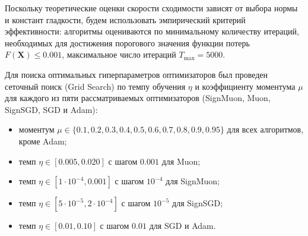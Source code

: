 \documentclass{article}
\begin{document}
Поскольку теоретические оценки скорости сходимости зависят от выбора нормы и констант гладкости, будем использовать эмпирический критерий эффективности: алгоритмы оцениваются по минимальному количеству итераций, необходимых для достижения порогового значения функции потерь $F(\mathbf{X}) \le 0.001$, максимальное число итераций $T_{\max} = 5000$. 

Для поиска оптимальных гиперпараметров оптимизаторов был проведен сеточный поиск (Grid Search) по темпу обучения $\eta$ и коэффициенту моментума $\mu$ для каждого из пяти рассматриваемых оптимизаторов (SignMuon, Muon, SignSGD, SGD и Adam):
\begin{itemize}
    \item моментум $\mu \in \{0.1, 0.2, 0.3, 0.4, 0.5, 0.6, 0.7, 0.8, 0.9, 0.95\}$ для всех алгоритмов, кроме Adam;
    \item темп $\eta \in [0.005, 0.020]$ с шагом $0.001$ для Muon;
    \item темп $\eta \in [1\cdot 10^{-4}, 0.001]$ с шагом $10^{-4}$ для SignMuon;
    \item темп $\eta \in [5\cdot 10^{-5}, 2\cdot 10^{-4}]$ с шагом $10^{-5}$ для SignSGD;
    \item темп $\eta \in [0.01, 0.10]$ с шагом $0.01$ для SGD и Adam.
\end{itemize}
\end{document}

